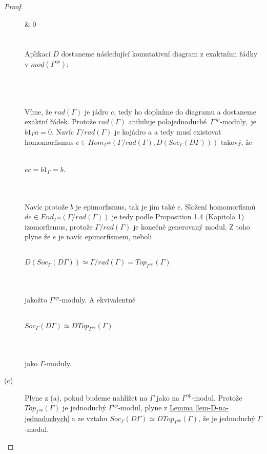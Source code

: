 \begin{proof}
\begin{description}
{{               & 0
           }}\\\\\\
           Aplikací $D$ dostaneme následující komutativní diagram z exaktními 
           řádky v $mod(\Gamma^{op})$:\\\\
           \centerline{}\\\\           
           Víme, že $rad(\Gamma)$ je jádro $c$, tedy ho doplníme do 
           diagramu a dostaneme exaktní řádek. Protože $rad(\Gamma)$ anihiluje 
           polojednoduché \,$\Gamma^{op}$-moduly, \,je $b1_\Gamma a=0$. Navíc
           $\Gamma/rad(\Gamma)$ je kojádro $a$ a tedy musí existovat 
           homomorfismus
           $e\in Hom_{\Gamma^{op}}(\Gamma/rad(\Gamma), D(Soc_\Gamma(D\Gamma)))$ 
           takový, že \\\\
           \centerline{$ec=b1_\Gamma=b$.}\\\\
           Navíc protože $b$ je epimorfismus, tak je jím také $e$. 
           Složení homomorfismů $de\in End_{\Gamma^{op}}(\Gamma/rad(\Gamma))$ je tedy podle 
           \cite{2} Proposition 1.4 (Kapitola 1) izomorfismus, protože $\Gamma/rad(\Gamma)$ 
           je konečně generovaný modul. Z toho plyne že $e$ je navíc 
           epimorfismem, neboli \\\\
           \centerline{$D(Soc_\Gamma(D\Gamma))\simeq \Gamma/rad(\Gamma)=Top_{\Gamma^{op}}(\Gamma)$} \\\\
           jakožto $\Gamma^{op}$-moduly. A ekvivalentně \\\\
           \centerline{$Soc_\Gamma(D\Gamma)\simeq DTop_{\Gamma^{op}}(\Gamma)$} 
           \\\\
           jako $\Gamma$-moduly.     
                    
         \item[(c)] Plyne z (a), pokud budeme nahlížet na $\Gamma$ jako na 
           $\Gamma^{op}$-modul. Protože $Top_{\Gamma^{op}}(\Gamma)$ je jednoduchý 
           $\Gamma^{op}$-modul, plyne z 
           \hyperref[lem-D-na-jednoduchych]{Lemma \ref*{lem-D-na-jednoduchych}} a ze 
           vztahu $Soc_\Gamma(D\Gamma)\simeq DTop_{\Gamma^{op}}(\Gamma)$, že je 
           jednoduchý $\Gamma$-modul.
       \end{description}
     \end{proof}

